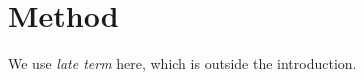 \documentclass{article}
\begin{document}
\begin{abstract}

\end{abstract}

\section{Method}
We use \emph{late term} here, which is outside the introduction.
\end{document}
